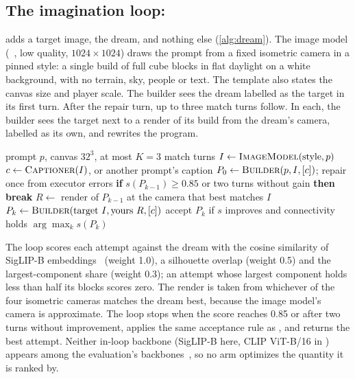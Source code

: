 \subsection{The imagination loop: \dream{}}
\label{sec:dream}

\dream{} adds a target image, the dream, and nothing else (\cref{alg:dream}). The image model
(\imgmini{}~\citep{openai2025gptimage}, low quality, $1024{\times}1024$) draws the prompt from a
fixed isometric camera in a pinned style: a single build of full cube blocks in flat daylight on a
white background, with no terrain, sky, people or text. The template also states the canvas size
and player scale. The builder sees the dream labelled as the target in its first turn. After the
repair turn, up to three match turns follow. In each, the builder sees the target next to a render
of its build from the dream's camera, labelled as its own, and rewrites the program.

\begin{algorithm}[t]
  \caption{\dream{}, \dreamcap{} and \shufcap{}. Lines marked $\dagger$ run only in the caption arms.}
  \label{alg:dream}
  \small
  \begin{algorithmic}[1]
    \Require prompt $p$, canvas $32^3$, at most $K{=}3$ match turns
    \State $I \gets \textsc{ImageModel}(\text{style}, p)$ 
    \State $c \gets \textsc{Captioner}(I)$, or another prompt's caption \Comment{$\dagger$}
    \State $P_0 \gets \textsc{Builder}(p, I, [c])$; repair once from executor errors
      \State \textbf{if} $s(P_{k-1}) \ge 0.85$ or two turns without gain \textbf{then break}
      \State $R \gets$ render of $P_{k-1}$ at the camera that best matches $I$
      \State $P_k \gets \textsc{Builder}(\text{target } I, \text{yours } R, [c])$
      \State accept $P_k$ if $s$ improves and connectivity holds
    \EndFor
    \State \Return $\arg\max_k s(P_k)$
  \end{algorithmic}
\end{algorithm}

The loop scores each attempt against the dream with the cosine similarity of SigLIP-B
embeddings~\citep{zhai2023siglip} (weight 1.0), a silhouette overlap (weight 0.5) and the
largest-component share (weight 0.3); an attempt whose largest component holds less than half its
blocks scores zero. The render is taken from whichever of the four isometric cameras matches the
dream best, because the image model's camera is approximate. The loop stops when the score reaches
0.85 or after two turns without improvement, applies the same acceptance rule as \classicm{}, and
returns the best attempt. Neither in-loop backbone (SigLIP-B here, CLIP ViT-B/16 in \classicm{})
appears among the evaluation's backbones~\citep{anonymous2027blindness}, so no arm optimizes the
quantity it is ranked by.

